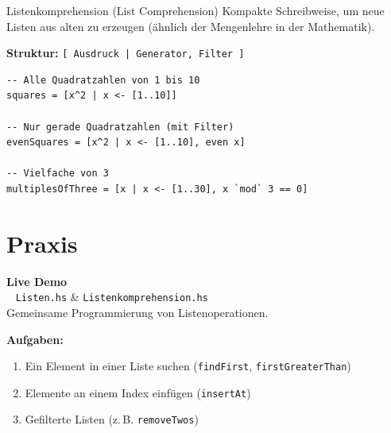 \documentclass[aspectratio=169,11pt]{beamer}
\begin{document}
\begin{frame}[fragile]{Listenkomprehension (List Comprehension)}
    Kompakte Schreibweise, um neue Listen aus alten zu erzeugen (ähnlich der Mengenlehre in der Mathematik).
    
    \textbf{Struktur:} \texttt{[ Ausdruck | Generator, Filter ]}
    
    \begin{tcolorbox}[successbox, title=Beispiele]
\begin{lstlisting}
-- Alle Quadratzahlen von 1 bis 10
squares = [x^2 | x <- [1..10]]

-- Nur gerade Quadratzahlen (mit Filter)
evenSquares = [x^2 | x <- [1..10], even x]

-- Vielfache von 3
multiplesOfThree = [x | x <- [1..30], x `mod` 3 == 0]
\end{lstlisting}
    \end{tcolorbox}
\end{frame}

\section{Praxis}

\begin{frame}[plain]
    \begin{center}
        \Huge \textbf{Live Demo} \\
        \vspace{0.5cm}
        \large \faLaptopCode~ \texttt{Listen.hs} \& \texttt{Listenkomprehension.hs} \\
        \vspace{0.3cm}
        \normalsize Gemeinsame Programmierung von Listenoperationen.
    \end{center}
    
    \vspace{0.5cm}
    \textbf{Aufgaben:}
    \begin{enumerate}
        \item Ein Element in einer Liste suchen (\texttt{findFirst}, \texttt{firstGreaterThan})
        \item Elemente an einem Index einfügen (\texttt{insertAt})
        \item Gefilterte Listen (z.\,B. \texttt{removeTwos})
    \end{enumerate}
\end{frame}
\end{document}

